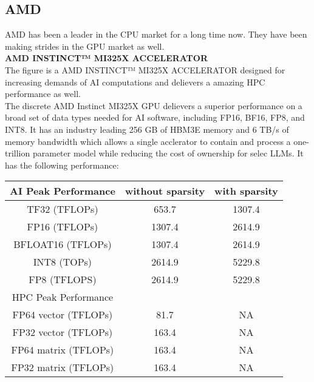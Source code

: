 \documentclass[12pt]{article}
\begin{document}
\subsection{AMD}
AMD has been a leader in the CPU market for a long time now. They have been making strides in the GPU market as well.\\
\textbf{AMD INSTINCT™ MI325X ACCELERATOR}\\
The figure is a AMD INSTINCT™ MI325X ACCELERATOR designed for increasing demands of AI computations and delievers a amazing HPC performance as well.\\
The discrete AMD Instinct MI325X GPU delievers a superior performance on a broad set of data types needed for AI software, including FP16, BF16, FP8, and INT8. It has an industry leading 256 GB of HBM3E memory and 6 TB/s of memory bandwidth which allows a single acclerator to contain and process a one-trillion parameter model while reducing the cost of ownership for selec LLMs. It has the following performance:\\
\begin{tabular}{c|c|c}
    \hline
    AI Peak Performance & without sparsity & with sparsity\\
    \hline
    TF32 (TFLOPs) & 653.7 & 1307.4\\
    FP16 (TFLOPs) & 1307.4 & 2614.9\\
    BFLOAT16 (TFLOPs) & 1307.4 & 2614.9\\
    INT8 (TOPs) & 2614.9 & 5229.8\\
    FP8 (TFLOPS) & 2614.9 & 5229.8\\
    \hline
    HPC Peak Performance & & \\
    \hline
    FP64 vector (TFLOPs) & 81.7 & NA\\
    FP32 vector (TFLOPs) & 163.4 & NA \\
    FP64 matrix (TFLOPs) & 163.4 & NA \\
    FP32 matrix (TFLOPs) & 163.4 & NA\\
\end{tabular}\\
\end{document}
